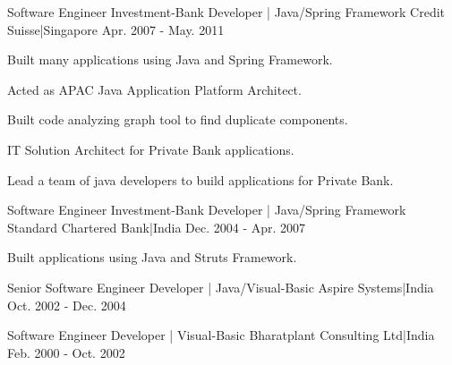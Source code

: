 \begin{cventries}
{\begin{cvitems}
      \end{cvitems}
    }
  \cventry
    {Software Engineer}
    {Investment-Bank Developer | Java/Spring Framework}
    {Credit Suisse|Singapore}
    {Apr. 2007 - May. 2011}
    {
      \begin{cvitems}
        \item {Built many applications using Java and Spring Framework.}
        \item {Acted as APAC Java Application Platform Architect.}
        \item {Built code analyzing graph tool to find duplicate components.}
        \item {IT Solution Architect for Private Bank applications.}
        \item {Lead a team of java developers to build applications for Private Bank.}
      \end{cvitems}
    }
  \cventry
    {Software Engineer}
    {Investment-Bank Developer | Java/Spring Framework}
    {Standard Chartered Bank|India}
    {Dec. 2004 - Apr. 2007}
    {
      \begin{cvitems}
        \item {Built applications using Java and Struts Framework.}
      \end{cvitems}
    }
  \cventry
    {Senior Software Engineer}
    {Developer | Java/Visual-Basic}
    {Aspire Systems|India}
    {Oct. 2002 - Dec. 2004}
    {
      \begin{cvitems}
      \end{cvitems}
    }
  \cventry
    {Software Engineer}
    {Developer | Visual-Basic}
    {Bharatplant Consulting Ltd|India}
    {Feb. 2000 - Oct. 2002}
    {
      \begin{cvitems}
      \end{cvitems}
    }
\end{cventries}
